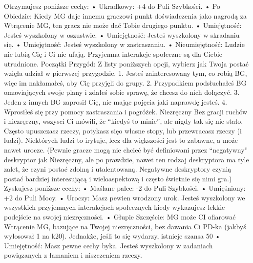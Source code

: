Otrzymujesz poniższe cechy:
    • Ukradkowy: +4 do Puli Szybkości.
    • Po Obiedzie: Kiedy MG daje innemu graczowi punkt doświadczenia jako nagrodą za Wtrącenie MG, ten gracz nie może dać Tobie drugiego punktu.
    • Umiejętność: Jesteś wyszkolony w oszustwie.
    • Umiejętność: Jesteś wyszkolony w skradaniu się.
    • Umiejętność: Jesteś wyszkolony w zastraszaniu.
    • Nieumiejętność: Ludzie nie lubią Cię i Ci nie ufają. Przyjemna interakcje społeczne są dla Ciebie utrudnione. 
Początki Przygód: Z listy poniższych opcji, wybierz jak Twoja postać wzięła udział w pierwszej przygodzie.
1. Jesteś zainteresowany tym, co robią BG, więc im nakłamałeś, aby Cię przyjęli do grupy.
2. Przypadkiem podsłuchałeś BG omawiających swoje plany i zdałeś sobie sprawę, że chcesz do nich dołączyć.
3. Jeden z innych BG zaprosił Cię, nie mając pojęcia jaki naprawdę jesteś.
4. Wprosiłeś się przy pomocy zastraszania i pogróżek.
Niezręczny
Bez gracji ruchów i niezręczny, wszysci Ci mówili, że “kiedyś to minie”, ale nigdy tak się nie stało. Często upuszczasz rzeczy, potykasz sięo własne stopy, lub przewracasz rzeczy (i ludzi). Niektórych ludzi to irytuje, lecz dla większości jest to zabawne, a może nawet urocze.
(Pewnie gracze mogą nie chcieć być definiowani przez “negatywny” deskryptor jak Niezręczny, ale po prawdzie, nawet ten rodzaj deskryptora ma tyle zalet, że czyni postać zdolną i utalentowaną. Negatywne deskryptory czynią postać bardziej interesującą i wieloaspektową i często świetnie się nimi gra.)
Zyskujesz poniższe cechy:
    • Maślane palce: -2 do Puli Szybkości.
    • Umięśniony: +2 do Puli Mocy.
    • Uroczy: Masz pewien wrodzony urok. Jesteś wyszkolony we wszystkich przyjemnych interakcjach społecznych kiedy wykazujesz lekkie podejście na swojej niezręczności.
    • Głupie Szczęście: MG może CI ofiarować Wtrącenie MG, bazujące na Twojej niezręczności, bez dawania Ci PD-ka (jakbyś wylosował 1 na k20). Jednakże, jeśli to się wydarzy, istnieje szansa 50%
    • Umiejętność: Masz pewne cechy byka. Jesteś wyszkolony w zadaniach powiązanych z łamaniem i niszczeniem rzeczy.
